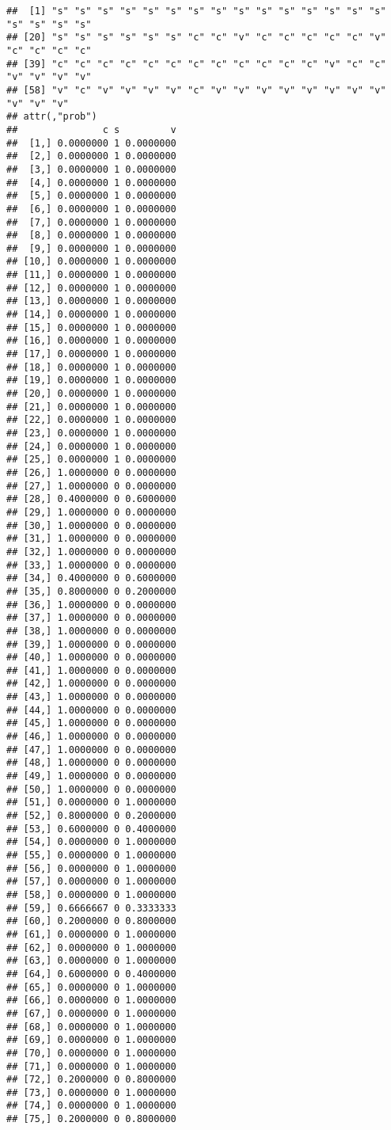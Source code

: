 \documentclass[
]{book}
\begin{document}
\begin{verbatim}
##  [1] "s" "s" "s" "s" "s" "s" "s" "s" "s" "s" "s" "s" "s" "s" "s" "s" "s" "s" "s"
## [20] "s" "s" "s" "s" "s" "s" "c" "c" "v" "c" "c" "c" "c" "c" "v" "c" "c" "c" "c"
## [39] "c" "c" "c" "c" "c" "c" "c" "c" "c" "c" "c" "c" "v" "c" "c" "v" "v" "v" "v"
## [58] "v" "c" "v" "v" "v" "v" "c" "v" "v" "v" "v" "v" "v" "v" "v" "v" "v" "v"
## attr(,"prob")
##               c s         v
##  [1,] 0.0000000 1 0.0000000
##  [2,] 0.0000000 1 0.0000000
##  [3,] 0.0000000 1 0.0000000
##  [4,] 0.0000000 1 0.0000000
##  [5,] 0.0000000 1 0.0000000
##  [6,] 0.0000000 1 0.0000000
##  [7,] 0.0000000 1 0.0000000
##  [8,] 0.0000000 1 0.0000000
##  [9,] 0.0000000 1 0.0000000
## [10,] 0.0000000 1 0.0000000
## [11,] 0.0000000 1 0.0000000
## [12,] 0.0000000 1 0.0000000
## [13,] 0.0000000 1 0.0000000
## [14,] 0.0000000 1 0.0000000
## [15,] 0.0000000 1 0.0000000
## [16,] 0.0000000 1 0.0000000
## [17,] 0.0000000 1 0.0000000
## [18,] 0.0000000 1 0.0000000
## [19,] 0.0000000 1 0.0000000
## [20,] 0.0000000 1 0.0000000
## [21,] 0.0000000 1 0.0000000
## [22,] 0.0000000 1 0.0000000
## [23,] 0.0000000 1 0.0000000
## [24,] 0.0000000 1 0.0000000
## [25,] 0.0000000 1 0.0000000
## [26,] 1.0000000 0 0.0000000
## [27,] 1.0000000 0 0.0000000
## [28,] 0.4000000 0 0.6000000
## [29,] 1.0000000 0 0.0000000
## [30,] 1.0000000 0 0.0000000
## [31,] 1.0000000 0 0.0000000
## [32,] 1.0000000 0 0.0000000
## [33,] 1.0000000 0 0.0000000
## [34,] 0.4000000 0 0.6000000
## [35,] 0.8000000 0 0.2000000
## [36,] 1.0000000 0 0.0000000
## [37,] 1.0000000 0 0.0000000
## [38,] 1.0000000 0 0.0000000
## [39,] 1.0000000 0 0.0000000
## [40,] 1.0000000 0 0.0000000
## [41,] 1.0000000 0 0.0000000
## [42,] 1.0000000 0 0.0000000
## [43,] 1.0000000 0 0.0000000
## [44,] 1.0000000 0 0.0000000
## [45,] 1.0000000 0 0.0000000
## [46,] 1.0000000 0 0.0000000
## [47,] 1.0000000 0 0.0000000
## [48,] 1.0000000 0 0.0000000
## [49,] 1.0000000 0 0.0000000
## [50,] 1.0000000 0 0.0000000
## [51,] 0.0000000 0 1.0000000
## [52,] 0.8000000 0 0.2000000
## [53,] 0.6000000 0 0.4000000
## [54,] 0.0000000 0 1.0000000
## [55,] 0.0000000 0 1.0000000
## [56,] 0.0000000 0 1.0000000
## [57,] 0.0000000 0 1.0000000
## [58,] 0.0000000 0 1.0000000
## [59,] 0.6666667 0 0.3333333
## [60,] 0.2000000 0 0.8000000
## [61,] 0.0000000 0 1.0000000
## [62,] 0.0000000 0 1.0000000
## [63,] 0.0000000 0 1.0000000
## [64,] 0.6000000 0 0.4000000
## [65,] 0.0000000 0 1.0000000
## [66,] 0.0000000 0 1.0000000
## [67,] 0.0000000 0 1.0000000
## [68,] 0.0000000 0 1.0000000
## [69,] 0.0000000 0 1.0000000
## [70,] 0.0000000 0 1.0000000
## [71,] 0.0000000 0 1.0000000
## [72,] 0.2000000 0 0.8000000
## [73,] 0.0000000 0 1.0000000
## [74,] 0.0000000 0 1.0000000
## [75,] 0.2000000 0 0.8000000
\end{verbatim}
\end{document}

